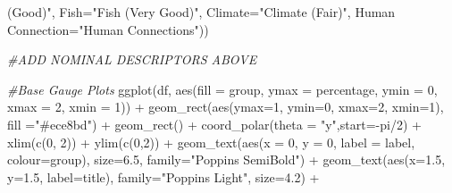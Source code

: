 \documentclass[
]{book}
\newenvironment{Shaded}{\begin{snugshade}}{\end{snugshade}}
\newcommand{\AttributeTok}[1]{\textcolor[rgb]{0.77,0.63,0.00}{#1}}
\newcommand{\CommentTok}[1]{\textcolor[rgb]{0.56,0.35,0.01}{\textit{#1}}}
\newcommand{\DecValTok}[1]{\textcolor[rgb]{0.00,0.00,0.81}{#1}}
\newcommand{\FloatTok}[1]{\textcolor[rgb]{0.00,0.00,0.81}{#1}}
\newcommand{\FunctionTok}[1]{\textcolor[rgb]{0.00,0.00,0.00}{#1}}
\newcommand{\NormalTok}[1]{#1}
\newcommand{\OtherTok}[1]{\textcolor[rgb]{0.56,0.35,0.01}{#1}}
\newcommand{\SpecialCharTok}[1]{\textcolor[rgb]{0.00,0.00,0.00}{#1}}
\newcommand{\StringTok}[1]{\textcolor[rgb]{0.31,0.60,0.02}{#1}}
\begin{document}
\begin{Shaded}
\begin{Highlighting}[]
\StringTok{(Good)"}\NormalTok{, }
                                        \StringTok{\textasciigrave{}}\AttributeTok{Fish}\StringTok{\textasciigrave{}}\OtherTok{=}\StringTok{"Fish }
\StringTok{(Very Good)"}\NormalTok{,}
                                        \StringTok{\textasciigrave{}}\AttributeTok{Climate}\StringTok{\textasciigrave{}}\OtherTok{=}\StringTok{"Climate }
\StringTok{(Fair)"}\NormalTok{,}
                                        \StringTok{\textasciigrave{}}\AttributeTok{Human Connection}\StringTok{\textasciigrave{}}\OtherTok{=}\StringTok{"Human Connections"}\NormalTok{))}

\CommentTok{\#ADD NOMINAL DESCRIPTORS ABOVE}

\CommentTok{\#Base Gauge Plots}
\FunctionTok{ggplot}\NormalTok{(df, }\FunctionTok{aes}\NormalTok{(}\AttributeTok{fill =}\NormalTok{ group, }\AttributeTok{ymax =}\NormalTok{ percentage, }\AttributeTok{ymin =} \DecValTok{0}\NormalTok{, }\AttributeTok{xmax =} \DecValTok{2}\NormalTok{, }\AttributeTok{xmin =} \DecValTok{1}\NormalTok{)) }\SpecialCharTok{+}
  \FunctionTok{geom\_rect}\NormalTok{(}\FunctionTok{aes}\NormalTok{(}\AttributeTok{ymax=}\DecValTok{1}\NormalTok{, }\AttributeTok{ymin=}\DecValTok{0}\NormalTok{, }\AttributeTok{xmax=}\DecValTok{2}\NormalTok{, }\AttributeTok{xmin=}\DecValTok{1}\NormalTok{), }\AttributeTok{fill =}\StringTok{"\#ece8bd"}\NormalTok{) }\SpecialCharTok{+}
  \FunctionTok{geom\_rect}\NormalTok{() }\SpecialCharTok{+}
  \FunctionTok{coord\_polar}\NormalTok{(}\AttributeTok{theta =} \StringTok{"y"}\NormalTok{,}\AttributeTok{start=}\SpecialCharTok{{-}}\NormalTok{pi}\SpecialCharTok{/}\DecValTok{2}\NormalTok{) }\SpecialCharTok{+} \FunctionTok{xlim}\NormalTok{(}\FunctionTok{c}\NormalTok{(}\DecValTok{0}\NormalTok{, }\DecValTok{2}\NormalTok{)) }\SpecialCharTok{+} \FunctionTok{ylim}\NormalTok{(}\FunctionTok{c}\NormalTok{(}\DecValTok{0}\NormalTok{,}\DecValTok{2}\NormalTok{)) }\SpecialCharTok{+}
  \FunctionTok{geom\_text}\NormalTok{(}\FunctionTok{aes}\NormalTok{(}\AttributeTok{x =} \DecValTok{0}\NormalTok{, }\AttributeTok{y =} \DecValTok{0}\NormalTok{, }\AttributeTok{label =}\NormalTok{ label, }\AttributeTok{colour=}\NormalTok{group), }\AttributeTok{size=}\FloatTok{6.5}\NormalTok{, }\AttributeTok{family=}\StringTok{"Poppins SemiBold"}\NormalTok{) }\SpecialCharTok{+}
  \FunctionTok{geom\_text}\NormalTok{(}\FunctionTok{aes}\NormalTok{(}\AttributeTok{x=}\FloatTok{1.5}\NormalTok{, }\AttributeTok{y=}\FloatTok{1.5}\NormalTok{, }\AttributeTok{label=}\NormalTok{title), }\AttributeTok{family=}\StringTok{"Poppins Light"}\NormalTok{, }\AttributeTok{size=}\FloatTok{4.2}\NormalTok{) }\SpecialCharTok{+}

\end{Highlighting}
\end{Shaded}
\end{document}
